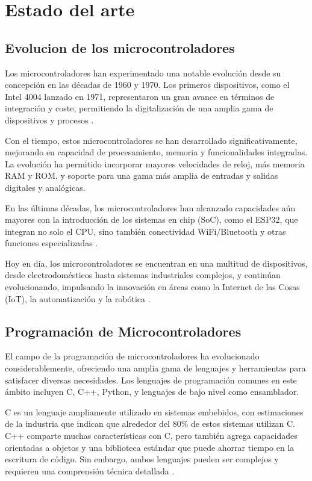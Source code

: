 \section{Estado del arte}

\subsection{Evolucion de los microcontroladores}

Los microcontroladores han experimentado una notable evolución desde su concepción en las décadas de 1960 y 1970. Los primeros dispositivos, como el Intel 4004 lanzado en 1971, representaron un gran avance en términos de integración y coste, permitiendo la digitalización de una amplia gama de dispositivos y procesos \cite{wikipedia_microcontroller}. 

Con el tiempo, estos microcontroladores se han desarrollado significativamente, mejorando en capacidad de procesamiento, memoria y funcionalidades integradas. La evolución ha permitido incorporar mayores velocidades de reloj, más memoria RAM y ROM, y soporte para una gama más amplia de entradas y salidas digitales y analógicas. 

En las últimas décadas, los microcontroladores han alcanzado capacidades aún mayores con la introducción de los sistemas en chip (SoC), como el ESP32, que integran no solo el CPU, sino también conectividad WiFi/Bluetooth y otras funciones especializadas \cite{semiengineering_evolution_mcu}. 

Hoy en día, los microcontroladores se encuentran en una multitud de dispositivos, desde electrodomésticos hasta sistemas industriales complejos, y continúan evolucionando, impulsando la innovación en áreas como la Internet de las Cosas (IoT), la automatización y la robótica \cite{wikipedia_microcontroller, semiengineering_evolution_mcu}.

\subsection{Programación de Microcontroladores}

El campo de la programación de microcontroladores ha evolucionado considerablemente, ofreciendo una amplia gama de lenguajes y herramientas para satisfacer diversas necesidades. Los lenguajes de programación comunes en este ámbito incluyen C, C++, Python, y lenguajes de bajo nivel como ensamblador.

C es un lenguaje ampliamente utilizado en sistemas embebidos, con estimaciones de la industria que indican que alrededor del 80\% de estos sistemas utilizan C. C++ comparte muchas características con C, pero también agrega capacidades orientadas a objetos y una biblioteca estándar que puede ahorrar tiempo en la escritura de código. Sin embargo, ambos lenguajes pueden ser complejos y requieren una comprensión técnica detallada \cite{qtio_microcontrollers}.

